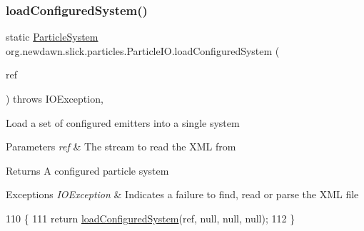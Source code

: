 \subsubsection{\texorpdfstring{load\+Configured\+System()}{loadConfiguredSystem()}\hspace{0.1cm}{\footnotesize\ttfamily [5/9]}}
{\footnotesize\ttfamily static \mbox{\hyperlink{classorg_1_1newdawn_1_1slick_1_1particles_1_1_particle_system}{Particle\+System}} org.\+newdawn.\+slick.\+particles.\+Particle\+I\+O.\+load\+Configured\+System (\begin{DoxyParamCaption}\item[{Input\+Stream}]{ref }\end{DoxyParamCaption}) throws I\+O\+Exception\hspace{0.3cm}{\ttfamily [inline]}, {\ttfamily [static]}}

Load a set of configured emitters into a single system


\begin{DoxyParams}{Parameters}
{\em ref} & The stream to read the X\+ML from \\
\hline
\end{DoxyParams}
\begin{DoxyReturn}{Returns}
A configured particle system 
\end{DoxyReturn}

\begin{DoxyExceptions}{Exceptions}
{\em I\+O\+Exception} & Indicates a failure to find, read or parse the X\+ML file \\
\hline
\end{DoxyExceptions}

\begin{DoxyCode}
110                                \{
111       \textcolor{keywordflow}{return} \mbox{\hyperlink{classorg_1_1newdawn_1_1slick_1_1particles_1_1_particle_i_o_a1da2bcc8784c9cf967326954bc3c9d33}{loadConfiguredSystem}}(ref, null, null, null);
112     \}
\end{DoxyCode}
\mbox{\label{classorg_1_1newdawn_1_1slick_1_1particles_1_1_particle_i_o_af28eccfb00d09019bf3b14c7f96bd702}} 
